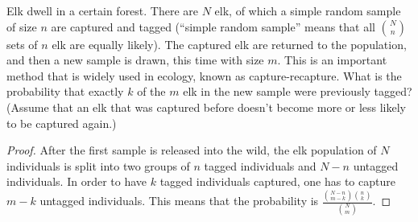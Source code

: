 \begin{exercise}{29}
Elk dwell in a certain forest. There are $N$ elk, of which a simple random sample of
size $n$ are captured and tagged (“simple random sample” means that all $N \choose n$ sets of $n$
elk are equally likely). The captured elk are returned to the population, and then a new
sample is drawn, this time with size $m$. This is an important method that is widely used
in ecology, known as capture-recapture. What is the probability that exactly $k$ of the $m$
elk in the new sample were previously tagged? (Assume that an elk that was captured
before doesn’t become more or less likely to be captured again.)
\end{exercise}

\begin{proof}
After the first sample is released into the wild, the elk population of $N$ individuals is split into two groups of $n$ tagged individuals and $N-n$ untagged individuals. In order to have $k$ tagged individuals captured, one has to capture $m-k$ untagged individuals. This means that the probability is $\frac{ {N-n \choose m-k}{n \choose k} }{ {N \choose m} }$. 
\end{proof}




